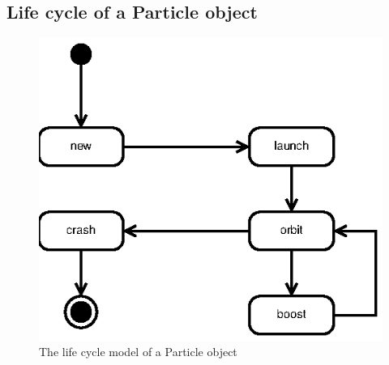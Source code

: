 \subsection{Life cycle of a Particle object}

\begin{figure}
  \centering
  \includegraphics{image/sequence-diagram-particle}
  \caption{The life cycle model of a Particle object}
\end{figure}
